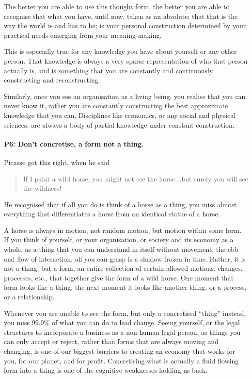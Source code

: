 The better you are able to use this thought form, the better you are able to recognise that what you have, until now, taken as an absolute; that that is the way the world is and has to be; is your personal construction determined by your practical needs emerging from your meaning\hyp{}making. 


This is especially true for any knowledge you have about yourself or any other person. That knowledge is always a very sparse representation of who that person actually is, and is something that you are constantly and continuously constructing and reconstructing. 


Similarly, once you see an organisation as a living being, you realise that you can never know it, rather you are constantly constructing the best approximate knowledge that you can. Disciplines like economics, or any social and physical sciences, are always a body of partial knowledge under constant construction.
\paragraph{\textbf{P6: Don’t concretise, a form not a thing.}}
Picasso  got this right, when he said 
\begin{quote} 
If I paint a wild horse, you might not see the horse \ldots but surely you will see the wildness! 
\end{quote} 
He recognised that if all you do is think of a horse as a thing, you miss almost everything that differentiates a horse from an identical statue of a horse.


A horse is always in motion, not random motion, but motion within some form. If you think of yourself, or your organisation, or society and its economy as a whole, as a thing that you can understand in itself without movement, the ebb and flow of interaction, all you can grasp is a shadow frozen in time. Rather, it is not a thing, but a form, an entire collection of certain allowed motions, changes, processes, etc., that together give the form of a wild horse. One moment that form looks like a thing, the next moment it looks like another thing, or a process, or a relationship.


Whenever you are unable to see the form, but only a concretised “thing” instead, you miss 99.9\% of what you can do to lead change. Seeing yourself, or the legal structures to incorporate a business as a non-human legal person, as things you can only accept or reject, rather than forms that are always moving and changing, is one of our biggest barriers to creating an economy that works for you, for our planet, and for profit. Concretising what is actually a fluid flowing form into a thing is one of the cognitive weaknesses holding us back.
